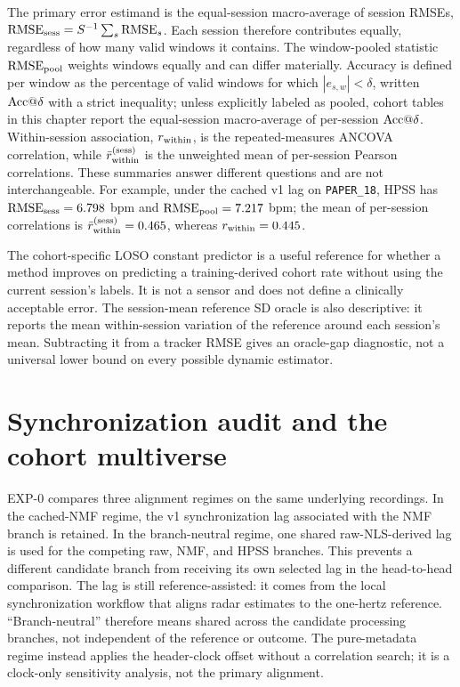 The primary error estimand is the equal-session macro-average of session RMSEs,
$\mathrm{RMSE}_{\mathrm{sess}}= S^{-1}\sum_s \mathrm{RMSE}_{s}$. Each session therefore contributes equally,
regardless of how many valid windows it contains. The window-pooled statistic $\mathrm{RMSE}_{\mathrm{pool}}$ weights
windows equally and can differ materially. Accuracy is defined per window as the percentage of
valid windows for which $|e_{s,w}|<\delta$, written $\mathrm{Acc}@\delta$ with a strict inequality;
unless explicitly labeled as pooled, cohort tables in this chapter report the equal-session
macro-average of per-session $\mathrm{Acc}@\delta$.
Within-session association, $r_{\mathrm{within}}$, is the repeated-measures ANCOVA correlation, while
$\bar{r}_{\mathrm{within}}^{(\mathrm{sess})}$ is the unweighted mean of per-session Pearson correlations. These summaries
answer different questions and are not interchangeable. For example, under the cached v1 lag on
\texttt{PAPER\_18}, HPSS has $\mathrm{RMSE}_{\mathrm{sess}}=6.798$ bpm and $\mathrm{RMSE}_{\mathrm{pool}}=7.217$ bpm; the mean of per-session
correlations is $\bar{r}_{\mathrm{within}}^{(\mathrm{sess})}=0.465$, whereas $r_{\mathrm{within}}=0.445$.

The cohort-specific LOSO constant predictor is a useful reference for whether a method improves
on predicting a training-derived cohort rate without using the current session's labels. It is
not a sensor and does not define a clinically acceptable error. The session-mean reference SD
oracle is also descriptive: it reports the mean within-session variation of the reference around
each session's mean. Subtracting it from a tracker RMSE gives an oracle-gap diagnostic, not a
universal lower bound on every possible dynamic estimator.

\section{Synchronization audit and the cohort multiverse}
\label{sec:ch3_synchronization}

EXP-0 compares three alignment regimes on the same underlying recordings. In the cached-NMF regime,
the v1 synchronization lag associated with the NMF branch is retained. In the branch-neutral
regime, one shared raw-NLS-derived lag is used for the competing raw, NMF, and HPSS branches. This
prevents a different candidate branch from receiving its own selected lag in the head-to-head
comparison. The lag is still reference-assisted: it comes from the local synchronization workflow
that aligns radar estimates to the one-hertz reference. ``Branch-neutral'' therefore means shared
across the candidate processing branches, not independent of the reference or outcome. The
pure-metadata regime instead applies the header-clock offset without a correlation search; it is a
clock-only sensitivity analysis, not the primary alignment.

